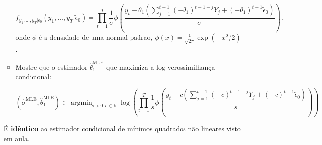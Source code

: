 \documentclass[10pt,a4paper]{article}
\begin{document}
\begin{enumerate}
\begin{itemize}
		$$f_{y_1,\ldots, y_T|\epsilon_0}(y_1,\ldots,y_T|\tilde{\epsilon}_0)=\prod_{t=1}^T \frac{1}{\sigma}\phi\left(\frac{y_t - \theta_1\left(\sum_{j=1}^{t-1}(-\theta_1)^{t-1 - j}Y_{j}  +  (-\theta_1)^{t-1}\tilde{\epsilon}_0\right)}{\sigma}\right)\, ,$$
	onde $\phi$ é a densidade de uma normal padrão, $\phi(x) = \frac{1}{\sqrt{2\pi}}\exp(-x^2/2)$.
	
	\item Mostre que o estimador $\hat{\theta}^{\text{MLE}}_1$ que maximiza a log-verossimilhança condicional:
	
	$$(\hat\sigma^{\text{MLE}}, \hat\theta_1^{\text{MLE}}) \in \operatorname{argmin}_{s> 0, c \in \mathbb{R}} \log\left(\prod_{t=1}^T\frac{1}{s}\phi\left(\frac{y_t - c\left(\sum_{j=1}^{t-1}(-c)^{t-1 - j}Y_{j}  +  (-c)^{t-1}\tilde{\epsilon}_0\right)}{s}\right)\right)$$
	\end{itemize}
	
	É \textbf{idêntico} ao estimador condicional de mínimos quadrados não lineares visto em aula.
\end{enumerate}
	
\end{document}
